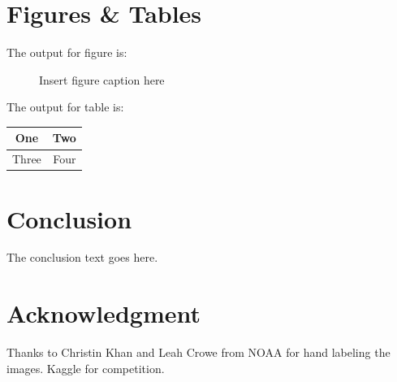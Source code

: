 \documentclass{IET}%
\begin{document}
\section{Figures \& Tables}

The output for figure is:

\begin{figure}[!h]
\caption{Insert figure caption here
}
\label{fig_sim}
\end{figure}


\vskip2pc

\noindent The output for table is:

\begin{table}[!h]
{%
\begin{tabular}{|c||c|}%
\hline
One & Two\\ %
\hline
Three & Four\\%
\hline
\end{tabular}}{}
\end{table}%

\section{Conclusion}
The conclusion text goes here.

\section{Acknowledgment}

Thanks to Christin Khan and Leah Crowe from NOAA for hand labeling the images. 
Kaggle for competition.
\end{document}
